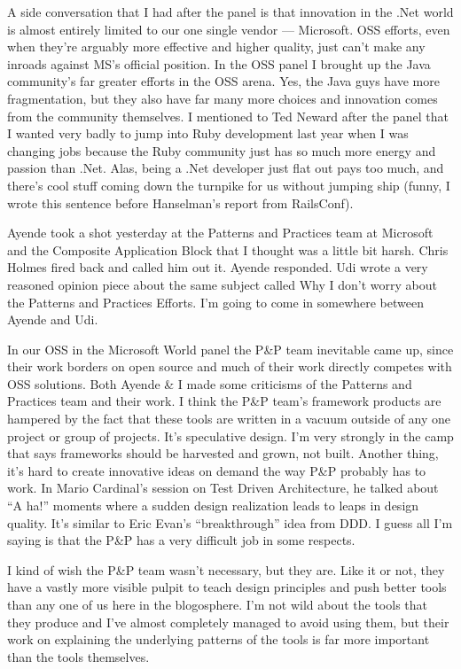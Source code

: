 \documentclass{article}
\begin{document}
{A side conversation that I had after the panel is that innovation in the .Net world is almost entirely limited to our one single vendor — Microsoft.  OSS efforts, even when they're arguably more effective and higher quality, just can't make any inroads against MS's official position.  In the OSS panel I brought up the Java community's far greater efforts in the OSS arena.  Yes, the Java guys have more fragmentation, but they also have far many more choices and innovation comes from the community themselves.  I mentioned to Ted Neward after the panel that I wanted very badly to jump into Ruby development last year when I was changing jobs because the Ruby community just has so much more energy and passion than .Net.  Alas, being a .Net developer just flat out pays too much, and there's cool stuff coming down the turnpike for us without jumping ship (funny, I wrote this sentence before Hanselman's report from RailsConf).

Ayende took a shot yesterday at the Patterns and Practices team at Microsoft and the Composite Application Block that I thought was a little bit harsh.  Chris Holmes fired back and called him out it.  Ayende responded.  Udi wrote a very reasoned opinion piece about the same subject called Why I don't worry about the Patterns and Practices Efforts.  I'm going to come in somewhere between Ayende and Udi.

In our OSS in the Microsoft World panel the P\&P team inevitable came up, since their work borders on open source and much of their work directly competes with OSS solutions.  Both Ayende \& I made some criticisms of the Patterns and Practices team and their work.  I think the P\&P team's framework products are hampered by the fact that these tools are written in a vacuum outside of any one project or group of projects.  It's speculative design.  I'm very strongly in the camp that says frameworks should be harvested and grown, not built.  Another thing, it's hard to create innovative ideas on demand the way P\&P probably has to work.  In Mario Cardinal's session on Test Driven Architecture, he talked about “A ha!” moments where a sudden design realization leads to leaps in design quality.  It's similar to Eric Evan's “breakthrough” idea from DDD.  I guess all I'm saying is that the P\&P has a very difficult job in some respects.

I kind of wish the P\&P team wasn't necessary, but they are.  Like it or not, they have a vastly more visible pulpit to teach design principles and push better tools than any one of us here in the blogosphere.  I'm not wild about the tools that they produce and I've almost completely managed to avoid using them, but their work on explaining the underlying patterns of the tools is far more important than the tools themselves.

}
\end{document}
